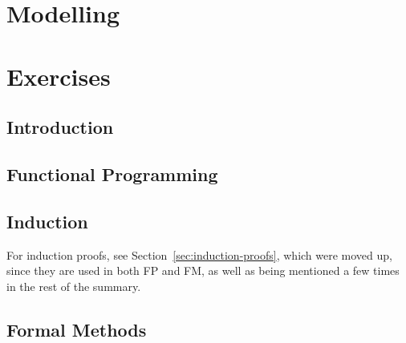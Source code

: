 \documentclass{article}
\begin{document}
\newsection
\section{Modelling}







% 
% 


\newsection
\section{Exercises}
\subsection{Introduction}


\subsection{Functional Programming}




% 

\subsection{Induction}
For induction proofs, see Section~\ref{sec:induction-proofs}, which were moved up, since they are used in both FP and FM,
as well as being mentioned a few times in the rest of the summary.

\newpage
\subsection{Formal Methods}





% 
% 

\newpage

\end{document}
